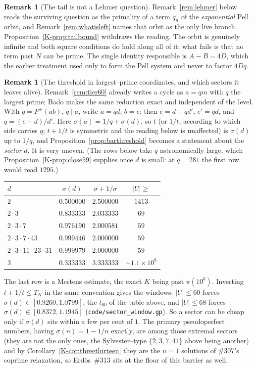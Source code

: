 \documentclass[11pt]{article}
\theoremstyle{definition}
\newtheorem{remark}[theorem]{Remark}
\begin{document}
\begin{remark}[The tail is not a Lehmer question]\label{rem:notlehmer}
Remark~\ref{rem:lehmer} below reads the surviving question as the primality of a term $q_n$ of the
\emph{exponential} Pell orbit, and Remark~\ref{rem:whatisleft} names that orbit as the only live
branch. Proposition~\ref{K-prop:tailbound} withdraws the reading. The orbit is genuinely infinite and
both square conditions do hold along all of it; what fails is that no term past $N$ can be prime.
The single identity responsible is $A-B=4D$, which the earlier treatment used only to form the Pell
system and never to factor $4Dq$.
\begin{remark}[The threshold in largest--prime coordinates, and which sectors it leaves alive]\label{rem:sectorlive}
Remark~\ref{rem:tier60} already writes a cycle as $a=qm$ with $q$ the largest prime; Bado
\cite{Bado2026} makes the same reduction exact and independent of the level. With $q=P^{+}(ab)$,
$q\mid a$, write $a=qd$, $b=e$: then $e=d+qd'$, $e'=qd$, and $q=(e-d)/d'$. Here
$\sigma(a)=1/q+\sigma(d)$, so $t$ (or $1/t$, according to which side carries $q$; $t+1/t$ is
symmetric and the reading below is unaffected) is $\sigma(d)$ up to $1/q$, and
Proposition~\ref{prop:barthreshold} becomes a statement about the \emph{sector} $d$. It is very
uneven. \textup{(}The rows below take $q$ astronomically large, which
Proposition~\ref{K-prop:close59} supplies once $d$ is small: at $q=281$ the first row would read
$1295$.\textup{)}

\smallskip
\begin{center}
\begin{tabular}{lccc}
$d$ & $\sigma(d)$ & $\sigma+1/\sigma$ & $|U|\ge$\\ \hline
$2$ & $0.500000$ & $2.500000$ & $1413$\\
$2\cdot3$ & $0.833333$ & $2.033333$ & $69$\\
$2\cdot3\cdot7$ & $0.976190$ & $2.000581$ & $59$\\
$2\cdot3\cdot7\cdot43$ & $0.999446$ & $2.000000$ & $59$\\
$2\cdot3\cdot11\cdot23\cdot31$ & $0.999979$ & $2.000000$ & $59$\\
$3$ & $0.333333$ & $3.333333$ & ${\sim}1.1\times10^{8}$\\
\end{tabular}
\end{center}
\smallskip

The last row is a Mertens estimate, the exact $K$ being past $\pi(10^6)$. Inverting
$t+1/t\le T_K$ in the same convention gives the windows: $|U|\le60$ forces
$\sigma(d)\in[0.9260,1.0799]$, the $t_{60}$ of the table above, and $|U|\le68$ forces
$\sigma(d)\in[0.8372,1.1945]$ \textup{(\texttt{code/sector\_window.gp})}. So a sector can be cheap
only if $\sigma(d)$ sits within a few per cent of $1$. The primary pseudoperfect numbers, having
$\sigma(n)=1-1/n$ exactly, are among those extremal sectors (they are not the only ones, the
Sylvester--type $\{2,3,7,41\}$ above being another) and by
Corollary~\ref{K-cor:threethirteen} they are the $u=1$ solutions of \#307's coprime relaxation, so
Erd\H{o}s~\#313 sits at the floor of this barrier as well.


\end{remark}
\end{remark}
\end{document}
